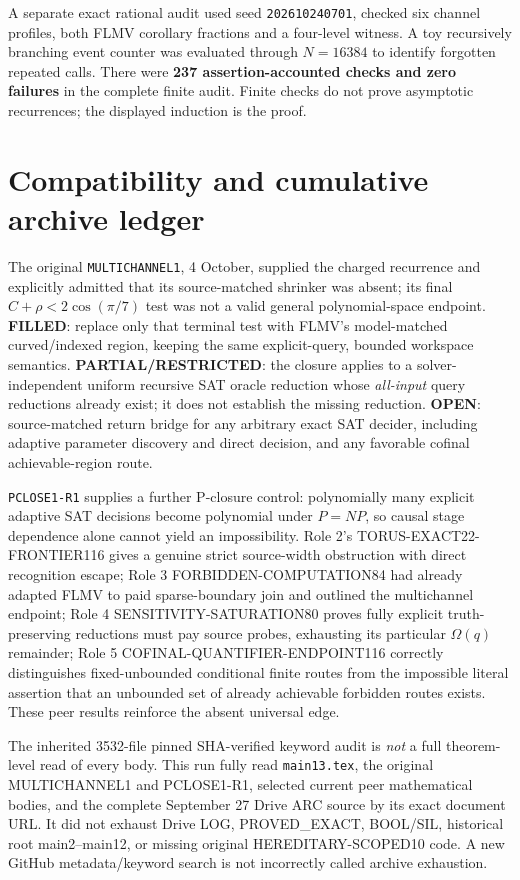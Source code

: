 \documentclass[11pt]{article}
\begin{document}
A separate exact rational audit used seed \texttt{202610240701}, checked six channel profiles, both FLMV corollary fractions and a four-level witness. A toy recursively branching event counter was evaluated through $N=16384$ to identify forgotten repeated calls. There were \textbf{237 assertion-accounted checks and zero failures} in the complete finite audit. Finite checks do not prove asymptotic recurrences; the displayed induction is the proof.

\section{Compatibility and cumulative archive ledger}
The original \texttt{MULTICHANNEL1}, 4 October, supplied the charged recurrence and explicitly admitted that its source-matched shrinker was absent; its final $C+\rho<2\cos(\pi/7)$ test was not a valid general polynomial-space endpoint. \textbf{FILLED}: replace only that terminal test with FLMV's model-matched curved/indexed region, keeping the same explicit-query, bounded workspace semantics. \textbf{PARTIAL/RESTRICTED}: the closure applies to a solver-independent uniform recursive SAT oracle reduction whose \emph{all-input} query reductions already exist; it does not establish the missing reduction. \textbf{OPEN}: source-matched return bridge for any arbitrary exact SAT decider, including adaptive parameter discovery and direct decision, and any favorable cofinal achievable-region route.

\texttt{PCLOSE1-R1} supplies a further P-closure control: polynomially many explicit adaptive SAT decisions become polynomial under $P=NP$, so causal stage dependence alone cannot yield an impossibility. Role 2's TORUS-EXACT22-FRONTIER116 gives a genuine strict source-width obstruction with direct recognition escape; Role 3 FORBIDDEN-COMPUTATION84 had already adapted FLMV to paid sparse-boundary join and outlined the multichannel endpoint; Role 4 SENSITIVITY-SATURATION80 proves fully explicit truth-preserving reductions must pay source probes, exhausting its particular $\Omega(q)$ remainder; Role 5 COFINAL-QUANTIFIER-ENDPOINT116 correctly distinguishes fixed-unbounded conditional finite routes from the impossible literal assertion that an unbounded set of already achievable forbidden routes exists. These peer results reinforce the absent universal edge.

The inherited 3532-file pinned SHA-verified keyword audit is \emph{not} a full theorem-level read of every body. This run fully read \texttt{main13.tex}, the original MULTICHANNEL1 and PCLOSE1-R1, selected current peer mathematical bodies, and the complete September 27 Drive ARC source by its exact document URL. It did not exhaust Drive LOG, PROVED\_EXACT, BOOL/SIL, historical root main2--main12, or missing original HEREDITARY-SCOPED10 code. A new GitHub metadata/keyword search is not incorrectly called archive exhaustion.
\end{document}
